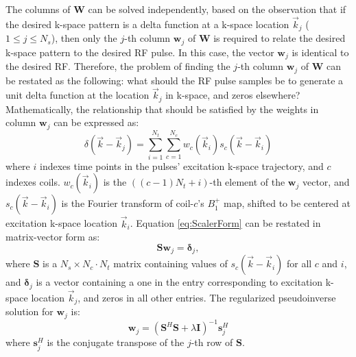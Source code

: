 \par The columns of $\bm{W}$ can be solved independently, 
based on the observation that if the desired k-space pattern is a delta function at a k-space location 
$\vec{k}_j$ ($1\leq j \leq N_s$), 
then only the $j$-th column $\bm{w}_j$ of $\bm{W}$ is required to relate 
the desired k-space pattern to the desired RF pulse. 
In this case, the vector $\bm{w}_j$ is identical to the desired RF. 
Therefore, the problem of finding the $j$-th column $\bm{w}_j$ of $\bm{W}$ can be restated as the following: 
what should the RF pulse samples be to generate a unit delta function at the location $\vec{k}_j$ in k-space, 
and zeros elsewhere? 
Mathematically, the relationship that should be satisfied by the weights in column $\bm{w}_j$  can be expressed as:   
\begin{equation}\label{eq:ScalerForm}
\delta(\vec{k}-\vec{k}_j)=\sum_{i=1}^{N_t}\sum_{c=1}^{N_c} w_c(\vec{k}_i) s_c(\vec{k}-\vec{k}_i)
\end{equation}
where $i$ indexes time points in the pulses' excitation k-space trajectory, 
and $c$ indexes coils. 
$w_c(\vec{k}_i)$ is the $((c-1)N_t+i)$-th element of the $\bm{w}_j$ vector,
and $s_c(\vec{k}-\vec{k}_i)$ is the Fourier transform of coil-$c$'s $B_1^+$ map, 
shifted to be centered at excitation k-space location $\vec{k}_i$. 
Equation \ref{eq:ScalerForm} can be restated in matrix-vector form as:                                       
\begin{equation}\label{eq:MatrixForm}
\bm{Sw}_j=\bm{\delta}_j,
\end{equation}
where $\bm{S}$ is a $N_s \times N_c \cdot N_t$ 
matrix containing values of $s_c(\vec{k}-\vec{k}_i)$ for all $c$ and $i$,
and $\bm{\delta}_j$ is a vector containing a one in the entry corresponding to excitation k-space location
$\vec{k}_j$, and zeros in all other entries. 
The regularized pseudoinverse solution for $\bm{w}_j$ is:                      
\begin{equation}\label{eq:Solution}
\bm{w}_j=\left( \bm{S}^{H} \bm{S} + \lambda \bm{I} \right) ^{-1} \bm{s}_j^{H}
\end{equation}
where $\bm{s}_j^{H}$ is the conjugate transpose of the $j$-th row of $\bm{S}$. 

